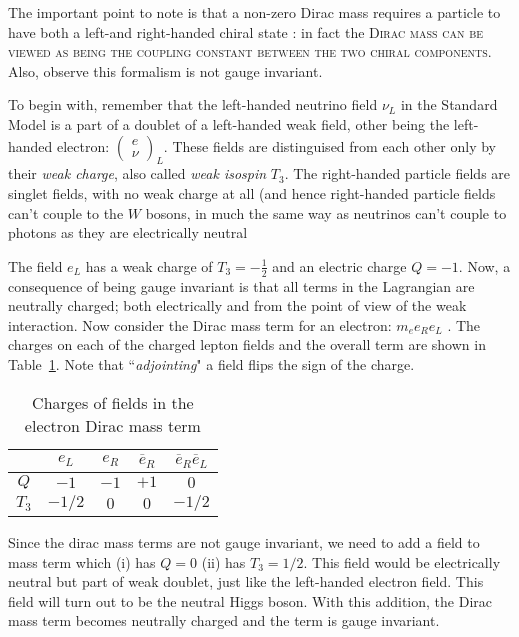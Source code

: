 The important point to note is that a non-zero Dirac mass requires a particle to have both a left-and right-handed chiral state : in fact the \textsc{Dirac mass can be viewed as being the coupling constant
between the two chiral components}. Also, observe this formalism is not gauge invariant.

To begin with, remember that the left-handed neutrino field \(\nu _L\) in the Standard Model is a part of a doublet of a left-handed weak field, other being the left-handed electron: \(\begin{pmatrix}e \\ \nu\end{pmatrix}_L\). These fields are distinguised from each other only by their \emph{weak charge}, also called \emph{weak isospin} \(T_3\). The right-handed particle fields are singlet fields, with no weak charge at all (and hence right-handed particle fields can’t couple to the $W$ bosons, in much the same way as neutrinos can’t couple to photons as they are electrically
neutral

The field \(e_L\) has a weak charge of $T_3 = - \frac{1}{2}$ and an electric charge $Q = -1$. Now, a consequence of being gauge invariant is that all terms in the Lagrangian are neutrally charged; both electrically and from the point of view of the weak interaction. Now consider the Dirac mass term for an electron: $m_e e_R e_L$ . The charges on each of the charged lepton fields and the overall term are shown in Table~\ref{tab:charges_sm}.
Note that ``\textit{adjointing}"  a field flips the sign of the charge.
\begin{table}[!h]
    \centering
    \begin{tabular}{|c|c|c|c|c|}\hline
    & $e_L$ & $e_R$ & $\overline {e}_R$ & $\overline {e}_R\overline {e}_L$\\\hline
    $Q$ & $-1$ & $-1$ & $+1$ & $0$\\
    $T_3$ & $-1/2$ & $0$ & $0$ & $-1/2$  \\\hline
    \end{tabular}
    \caption{Charges of fields in the electron Dirac mass term}
    \label{tab:charges_sm}
\end{table}
Since the dirac mass terms are not gauge invariant, we need to add a field to mass term which (i) has \(Q = 0\) (ii) has \(T_3 = 1/2\). This field would be electrically neutral but part of weak doublet, just like the left-handed electron field. This field will turn out to be the neutral Higgs boson. With this addition, the Dirac mass term becomes neutrally charged and the term is gauge invariant.

